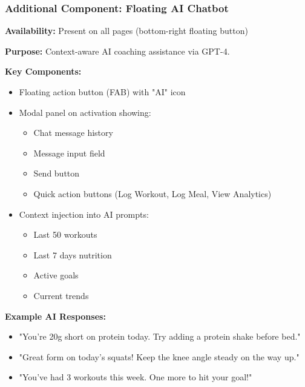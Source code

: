 \documentclass[12pt,a4paper]{article}
\begin{document}
\vspace{0.5cm}
\noindent{}
\vspace{1cm}


\subsubsection*{Additional Component: Floating AI Chatbot}

\textbf{Availability:} Present on all pages (bottom-right floating button)

\textbf{Purpose:} Context-aware AI coaching assistance via GPT-4.

\textbf{Key Components:}
\begin{itemize}[noitemsep, topsep=2pt]
  \item Floating action button (FAB) with "AI" icon
  \item Modal panel on activation showing:
    \begin{itemize}[noitemsep, topsep=0pt]
      \item Chat message history
      \item Message input field
      \item Send button
      \item Quick action buttons (Log Workout, Log Meal, View Analytics)
    \end{itemize}
  \item Context injection into AI prompts:
    \begin{itemize}[noitemsep, topsep=0pt]
      \item Last 50 workouts
      \item Last 7 days nutrition
      \item Active goals
      \item Current trends
    \end{itemize}
\end{itemize}

\textbf{Example AI Responses:}
\begin{itemize}[noitemsep, topsep=2pt]
  \item "You're 20g short on protein today. Try adding a protein shake before bed."
  \item "Great form on today's squats! Keep the knee angle steady on the way up."
  \item "You've had 3 workouts this week. One more to hit your goal!"
\end{itemize}
\end{document}
